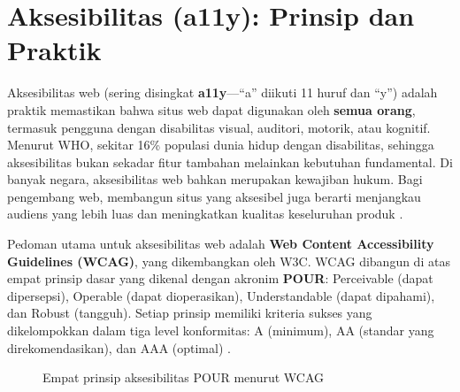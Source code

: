 ﻿\section[Aksesibilitas: Prinsip dan Praktik]{Aksesibilitas (a11y): Prinsip dan Praktik}

Aksesibilitas web (sering disingkat \textbf{a11y}---``a'' diikuti 11 huruf dan ``y'') adalah praktik memastikan bahwa situs web dapat digunakan oleh \textbf{semua orang}, termasuk pengguna dengan disabilitas visual, auditori, motorik, atau kognitif. Menurut WHO, sekitar 16\% populasi dunia hidup dengan disabilitas, sehingga aksesibilitas bukan sekadar fitur tambahan melainkan kebutuhan fundamental. Di banyak negara, aksesibilitas web bahkan merupakan kewajiban hukum. Bagi pengembang web, membangun situs yang aksesibel juga berarti menjangkau audiens yang lebih luas dan meningkatkan kualitas keseluruhan produk \cite{mdnAccessibility}.

Pedoman utama untuk aksesibilitas web adalah \textbf{Web Content Accessibility Guidelines (WCAG)}, yang dikembangkan oleh W3C. WCAG dibangun di atas empat prinsip dasar yang dikenal dengan akronim \textbf{POUR}: Perceivable (dapat dipersepsi), Operable (dapat dioperasikan), Understandable (dapat dipahami), dan Robust (tangguh). Setiap prinsip memiliki kriteria sukses yang dikelompokkan dalam tiga level konformitas: A (minimum), AA (standar yang direkomendasikan), dan AAA (optimal) \cite{wcagW3c}.

\begin{figure}[H]
\centering
{}
\caption{Empat prinsip aksesibilitas POUR menurut WCAG}
\end{figure}

